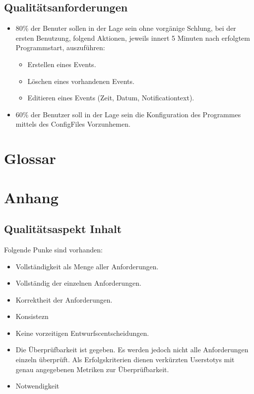 \documentclass[11pt,titelpage]{scrartcl}
\begin{document}
\subsection{Qualitätsanforderungen}
\begin{itemize}
\item 80\% der Benuter sollen in der Lage sein ohne vorgänige Schlung, bei der ersten Benutzung, folgend Aktionen, jeweils innert 5 Minuten nach erfolgtem Programmstart, auszuführen:
\begin{itemize}
\item Erstellen eines Events.
\item Löschen eines vorhandenen Events.
\item Editieren eines Events (Zeit, Datum, Notificationtext).
\end{itemize}

\item 60\% der Benutzer soll in der Lage sein die Konfiguration des Programmes mittels des ConfigFiles Vorzunhemen.
\end{itemize}

\section{Glossar}
\listoffigures
\listoftables

\glsaddall
\printglossary
\section{Anhang}
\subsection{Qualitätsaspekt Inhalt}
Folgende Punke sind vorhanden:
\begin{itemize}
 \item Vollständigkeit als Menge aller Anforderungen.
 \item Vollständig der einzelnen Anforderungen.
 \item Korrektheit der Anforderungen.
 \item Konsistezn
 \item Keine vorzeitigen Entwurfscentscheidungen.
 \item Die Überprüfbarkeit ist gegeben. Es werden jedoch nicht alle Anforderungen einzeln überprüft. Als Erfolgskriterien dienen verkürzten Userstotys mit genau angegebenen Metriken zur Überprüfbarkeit.
 \item Notwendigkeit
\end{itemize}
\end{document}
